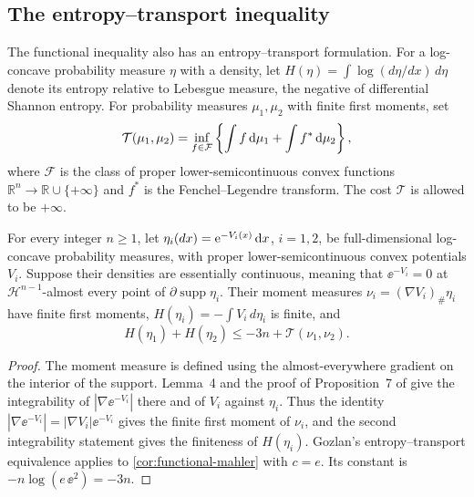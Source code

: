 \subsection{The entropy--transport inequality}

The functional inequality also has an entropy--transport formulation. For a log-concave probability measure $\eta$ with a density, let $H(\eta)=\int\log(d\eta/dx)\,d\eta$ denote its entropy relative to Lebesgue measure, the negative of differential Shannon entropy. For probability measures $\mu_1,\mu_2$ with finite first moments, set
\[
 \mathcal{T}(\mu_1,\mu_2)=
 \inf_{f\in\mathcal{F}}\left\{\int f\,\mathrm{d} \mu_1+\int f^*\,\mathrm{d} \mu_2\right\},
\]
where $\mathcal{F}$ is the class of proper lower-semicontinuous convex functions $\mathbb{R}^n\to\mathbb{R}\cup\{+\infty\}$ and $f^*$ is the Fenchel--Legendre transform. The cost $\mathcal{T}$ is allowed to be $+\infty$.

\begin{corollary}\label{cor:entropy-transport}
For every integer $n\ge1$, let $\eta_i(dx)=\mathrm{e}^{-V_i(x)}\,\mathrm{d} x$, $i=1,2$, be full-dimensional log-concave probability measures, with proper lower-semicontinuous convex potentials $V_i$. Suppose their densities are essentially continuous, meaning that $\ee^{-V_i}=0$ at $\mathcal{H}^{n-1}$-almost every point of $\partial\operatorname{supp}\eta_i$. Their moment measures $\nu_i=(\nabla V_i)_\#\eta_i$ have finite first moments, $H(\eta_i)=-\int V_i\,d\eta_i$ is finite, and
\[
 H(\eta_1)+H(\eta_2)\le -3n+\mathcal{T}(\nu_1,\nu_2).
\]
\end{corollary}

\begin{proof}
The moment measure is defined using the almost-everywhere gradient on the interior of the support. Lemma~4 and the proof of Proposition~7 of \cite{CorderoErausquinKlartag2015} give the integrability of $|\nabla \ee^{-V_i}|$ there and of $V_i$ against $\eta_i$. Thus the identity $|\nabla \ee^{-V_i}|=|\nabla V_i|\ee^{-V_i}$ gives the finite first moment of $\nu_i$, and the second integrability statement gives the finiteness of $H(\eta_i)$. Gozlan's entropy--transport equivalence \cite[Theorem~1.3 in the author manuscript]{FradeliziGozlanZugmeyer2023} applies to \cref{cor:functional-mahler} with $c=e$. Its constant is $-n\log(e\,\ee^2)=-3n$.
\end{proof}
